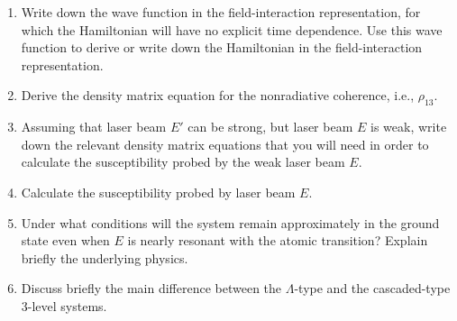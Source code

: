 \documentclass[12pt]{article}
\begin{document}
\begin{enumerate}[label=(\alph*)]
    \item Write down the wave function in the field-interaction representation, for which the Hamiltonian will have no explicit time dependence. Use this wave function to derive or write down the Hamiltonian in the field-interaction representation.
    \item Derive the density matrix equation for the nonradiative coherence, i.e., $\rho_{13}$.
    \item Assuming that laser beam $E'$ can be strong, but laser beam $E$ is weak, write down the relevant density matrix equations that you will need in order to calculate the susceptibility probed by the weak laser beam $E$.
    \item Calculate the susceptibility probed by laser beam $E$.
    \item Under what conditions will the system remain approximately in the ground state even when $E$ is nearly resonant with the atomic transition? Explain briefly the underlying physics.
    \item Discuss briefly the main difference between the $\Lambda$-type and the cascaded-type 3-level systems.
\end{enumerate}
\end{document}
